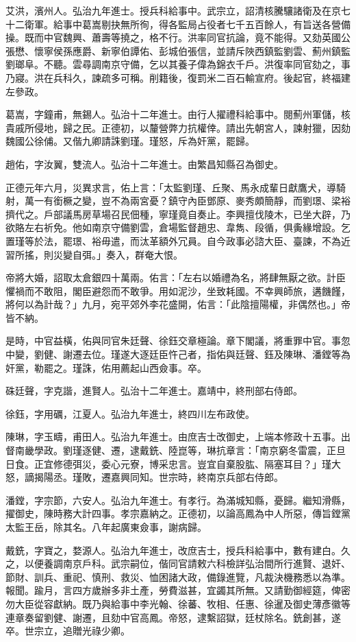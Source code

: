 \begin{pinyinscope}
艾洪，濱州人。弘治九年進士。授兵科給事中。武宗立，詔清核騰驤諸衛及在京七十二衛軍。給事中葛嵩剔抉無所徇，得各監局占役者七千五百餘人，有旨送各營備操。既而中官魏興、蕭壽等撓之，格不行。洪率同官抗論，竟不能得。又劾英國公張懋、懷寧侯孫應爵、新寧伯譚佑、彭城伯張信，並請斥陜西鎮監劉雲、薊州鎮監劉瑯阜。不聽。雲尋調南京守備，乞以其養子偉為錦衣千戶。洪復率同官劾之，事乃寢。洪在兵科久，諫疏多可稱。削籍後，復罰米二百石輸宣府。後起官，終福建左參政。

葛嵩，字鐘甫，無錫人。弘治十二年進士。由行人擢禮科給事中。閱薊州軍儲，核貴戚所侵地，歸之民。正德初，以釐營弊力抗權倖。請出先朝宮人，諫射獵，因劾魏國公徐俌。又偕九卿請誅劉瑾。瑾怒，斥為奸黨，罷歸。

趙佑，字汝翼，雙流人。弘治十二年進士。由繁昌知縣召為御史。

正德元年六月，災異求言，佑上言：「太監劉瑾、丘聚、馬永成輩日獻鷹犬，導騎射，萬一有銜橛之變，豈不為兩宮憂？鎮守內臣鄧原、麥秀頗簡靜，而劉璟、梁裕擠代之。戶部議馬房草場召民佃種，寧瑾竟自奏止。李興擅伐陵木，已坐大辟，乃欲賂左右祈免。他如南京守備劉雲，倉場監督趙忠、韋雋、段循，俱夤緣增設。乞置瑾等於法，罷璟、裕毋遣，而汰革額外冗員。自今政事必諮大臣、臺諫，不為近習所搖，則災變自弭。」奏入，群奄大恨。

帝將大婚，詔取太倉銀四十萬兩。佑言：「左右以婚禮為名，將肆無厭之欲。計臣懼禍而不敢阻，閣臣避怨而不敢爭。用如泥沙，坐致耗國。不幸興師旅，遘饑饉，將何以為計哉？」九月，宛平郊外李花盛開，佑言：「此陰擅陽權，非偶然也。」帝皆不納。

是時，中官益橫，佑與同官朱廷聲、徐鈺交章極論。章下閣議，將重罪中官。事忽中變，劉健、謝遷去位。瑾遂大逐廷臣忤己者，指佑與廷聲、鈺及陳琳、潘鏜等為奸黨，勒罷之。瑾誅，佑用薦起山西僉事。卒。

硃廷聲，字克諧，進賢人。弘治十二年進士。嘉靖中，終刑部右侍郎。

徐鈺，字用礪，江夏人。弘治九年進士，終四川左布政使。

陳琳，字玉疇，甫田人。弘治九年進士。由庶吉士改御史，上端本修政十五事。出督南畿學政。劉瑾逐健、遷，逮戴銑、陸崑等，琳抗章言：「南京窮冬雷震，正旦日食。正宜修德弭災，委心元寮，博采忠言。豈宜自棄股肱、隔塞耳目？」瑾大怒，謫揭陽丞。瑾敗，遷嘉興同知。世宗時，終南京兵部右侍郎。

潘鏜，字宗節，六安人。弘治九年進士。有孝行。為滿城知縣，憂歸。繼知滑縣，擢御史，陳時務大計四事。孝宗嘉納之。正德初，以論高鳳為中人所惡，傳旨鏜黨太監王岳，除其名。八年起廣東僉事，謝病歸。

戴銑，字寶之，婺源人。弘治九年進士，改庶吉士，授兵科給事中，數有建白。久之，以便養調南京戶科。武宗嗣位，偕同官請敕六科檢詳弘治間所行進賢、退奸、節財、訓兵、重祀、慎刑、救災、恤困諸大政，備錄進覽，凡裁決機務悉以為準。報聞。踰月，言四方歲辦多非土產，勞費滋甚，宜蠲其所無。又請勤御經筵，俾密勿大臣從容獻納。既乃與給事中李光翰、徐蕃、牧相、任惠、徐暹及御史薄彥徽等連章奏留劉健、謝遷，且劾中官高鳳。帝怒，逮繫詔獄，廷杖除名。銑創甚，遂卒。世宗立，追贈光祿少卿。


\end{pinyinscope}
